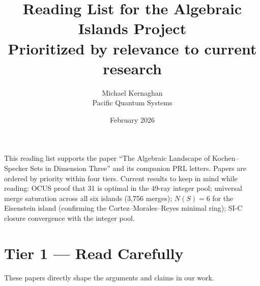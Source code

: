 \documentclass[11pt,a4paper]{article}
\title{Reading List for the Algebraic Islands Project\\[4pt]
\large Prioritized by relevance to current research}
\author{Michael Kernaghan\\Pacific Quantum Systems}
\date{February 2026}
\begin{document}
\maketitle

\noindent This reading list supports the paper ``The Algebraic Landscape of Kochen--Specker Sets in Dimension Three'' and its companion PRL letters.  Papers are ordered by priority within four tiers.  Current results to keep in mind while reading: OCUS proof that 31 is optimal in the 49-ray integer pool; universal merge saturation across all six islands (3{,}756 merges); $N(S) = 6$ for the Eisenstein island (confirming the Cortez--Morales--Reyes minimal ring); SI-C closure convergence with the integer pool.

\bigskip

\section*{\textcolor{tier1}{Tier 1 --- Read Carefully}}

These papers directly shape the arguments and claims in our work.
\end{document}
